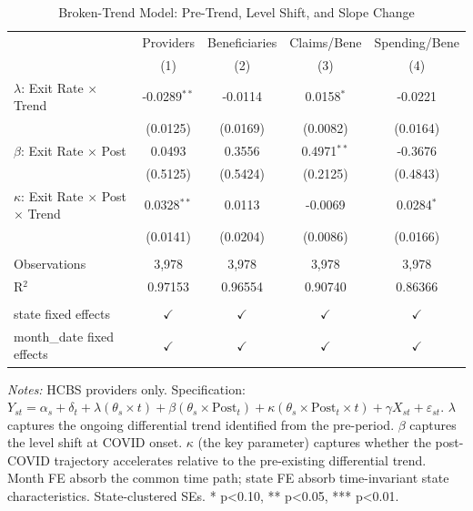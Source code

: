 
\begin{table}[htbp]
   \caption{\label{tab:broken_trend} Broken-Trend Model: Pre-Trend, Level Shift, and Slope Change}
   \bigskip
   \centering
   \begin{tabular}{lcccc}
      \toprule
                                                          & Providers      & Beneficiaries & Claims/Bene   & Spending/Bene \\   
                                                          & (1)            & (2)           & (3)           & (4)\\  
      \midrule 
      $\lambda$: Exit Rate $\times$ Trend                 & -0.0289$^{**}$ & -0.0114       & 0.0158$^{*}$  & -0.0221\\   
                                                          & (0.0125)       & (0.0169)      & (0.0082)      & (0.0164)\\   
      $\beta$: Exit Rate $\times$ Post                    & 0.0493         & 0.3556        & 0.4971$^{**}$ & -0.3676\\   
                                                          & (0.5125)       & (0.5424)      & (0.2125)      & (0.4843)\\   
      $\kappa$: Exit Rate $\times$ Post $\times$ Trend    & 0.0328$^{**}$  & 0.0113        & -0.0069       & 0.0284$^{*}$\\   
                                                          & (0.0141)       & (0.0204)      & (0.0086)      & (0.0166)\\   
       \\
      Observations                                        & 3,978          & 3,978         & 3,978         & 3,978\\  
      R$^2$                                               & 0.97153        & 0.96554       & 0.90740       & 0.86366\\  
       \\
      state fixed effects                                 & $\checkmark$   & $\checkmark$  & $\checkmark$  & $\checkmark$\\   
      month\_date fixed effects                           & $\checkmark$   & $\checkmark$  & $\checkmark$  & $\checkmark$\\   
      \bottomrule
   \end{tabular}
   
   \par \raggedright 
   \textit{Notes:} HCBS providers only. Specification: $Y_{st} = \alpha_s + \delta_t + \lambda(\theta_s \times t) + \beta(\theta_s \times \text{Post}_t) + \kappa(\theta_s \times \text{Post}_t \times t) + \gamma X_{st} + \varepsilon_{st}$. $\lambda$ captures the ongoing differential trend identified from the pre-period. $\beta$ captures the level shift at COVID onset. $\kappa$ (the key parameter) captures whether the post-COVID trajectory accelerates relative to the pre-existing differential trend. Month FE absorb the common time path; state FE absorb time-invariant state characteristics. State-clustered SEs. * p<0.10, ** p<0.05, *** p<0.01.
\end{table}



